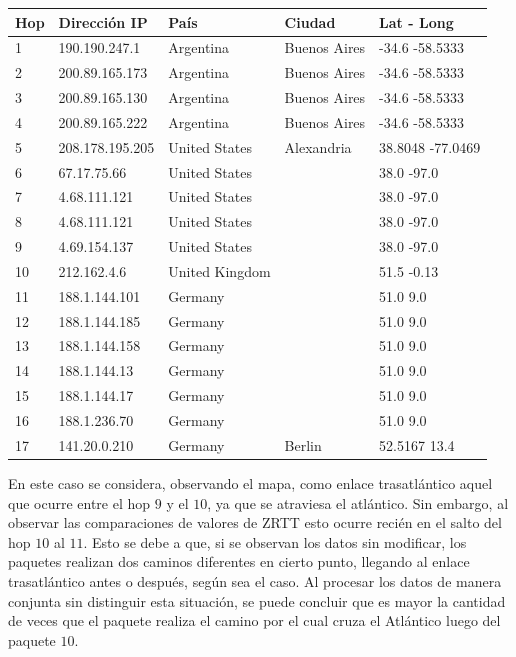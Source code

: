 \begin{center}
 \begin{tabular}{|l|l|l|l|l|}
    \hline
    Hop &Dirección IP &País &Ciudad &Lat - Long \\ \hline \hline
    1 & 190.190.247.1 & Argentina & Buenos Aires & -34.6 -58.5333	\\ \hline
    2 & 200.89.165.173 & Argentina & Buenos Aires & -34.6 -58.5333	\\ \hline
    3 & 200.89.165.130 & Argentina & Buenos Aires & -34.6 -58.5333	\\ \hline
    4 & 200.89.165.222 & Argentina & Buenos Aires & -34.6 -58.5333	\\ \hline
    5 & 208.178.195.205 & United States & Alexandria & 38.8048 -77.0469 \\ \hline
    6 & 67.17.75.66 & United States &  & 38.0 -97.0 \\ \hline
    7 & 4.68.111.121 & United States & & 38.0 -97.0 \\ \hline
    8 & 4.68.111.121 & United States & & 38.0 -97.0 \\ \hline
    9 & 4.69.154.137 & United States & & 38.0 -97.0 \\ \hline
    10 & 212.162.4.6 & United Kingdom & &  51.5 -0.13 \\ \hline
    11 & 188.1.144.101 & Germany &  & 51.0 9.0 \\ \hline
    12 & 188.1.144.185 & Germany &  & 51.0 9.0 \\ \hline
    13 & 188.1.144.158 & Germany &  & 51.0 9.0 \\ \hline
    14 & 188.1.144.13 & Germany &  & 51.0 9.0 \\ \hline
    15 & 188.1.144.17 & Germany &  & 51.0 9.0 \\ \hline
    16 & 188.1.236.70 & Germany &  & 51.0 9.0 \\ \hline
    17 & 141.20.0.210 & Germany & Berlin & 52.5167 13.4 \\ \hline
 \end{tabular}
\end{center}

En este caso se considera, observando el mapa, como enlace trasatlántico aquel que ocurre entre el hop $9$ y el $10$, ya que se atraviesa el atlántico. Sin embargo, al observar las comparaciones de valores de ZRTT esto ocurre recién en el salto del hop $10$ al $11$. Esto se debe a que, si se observan los datos sin modificar, los paquetes realizan dos caminos diferentes en cierto punto, llegando al enlace trasatlántico antes o después, según sea el caso. Al procesar los datos de manera conjunta sin distinguir esta situación, se puede concluir que es mayor la cantidad de veces que el paquete realiza el camino por el cual cruza el Atlántico luego del paquete $10$. 


